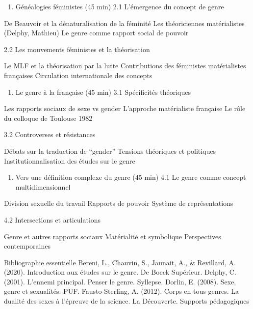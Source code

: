 \documentclass[
  letterpaper,
  DIV=11,
  numbers=noendperiod]{scrreprt}
\providecommand{\tightlist}{%
  \setlength{\itemsep}{0pt}\setlength{\parskip}{0pt}}\usepackage{longtable,booktabs,array}
\begin{document}
\begin{enumerate}
\def\labelenumi{\arabic{enumi}.}
\setcounter{enumi}{1}
\tightlist
\item
  Généalogies féministes (45 min) 2.1 L'émergence du concept de genre
\end{enumerate}

De Beauvoir et la dénaturalisation de la féminité Les théoriciennes
matérialistes (Delphy, Mathieu) Le genre comme rapport social de pouvoir

2.2 Les mouvements féministes et la théorisation

Le MLF et la théorisation par la lutte Contributions des féministes
matérialistes françaises Circulation internationale des concepts

\begin{enumerate}
\def\labelenumi{\arabic{enumi}.}
\setcounter{enumi}{2}
\tightlist
\item
  Le genre à la française (45 min) 3.1 Spécificités théoriques
\end{enumerate}

Les rapports sociaux de sexe vs gender L'approche matérialiste française
Le rôle du colloque de Toulouse 1982

3.2 Controverses et résistances

Débats sur la traduction de ``gender'' Tensions théoriques et politiques
Institutionnalisation des études sur le genre

\begin{enumerate}
\def\labelenumi{\arabic{enumi}.}
\setcounter{enumi}{3}
\tightlist
\item
  Vers une définition complexe du genre (45 min) 4.1 Le genre comme
  concept multidimensionnel
\end{enumerate}

Division sexuelle du travail Rapports de pouvoir Système de
représentations

4.2 Intersections et articulations

Genre et autres rapports sociaux Matérialité et symbolique Perspectives
contemporaines

Bibliographie essentielle Bereni, L., Chauvin, S., Jaunait, A., \&
Revillard, A. (2020). Introduction aux études sur le genre. De Boeck
Supérieur. Delphy, C. (2001). L'ennemi principal. Penser le genre.
Syllepse. Dorlin, E. (2008). Sexe, genre et sexualités. PUF.
Fausto-Sterling, A. (2012). Corps en tous genres. La dualité des sexes à
l'épreuve de la science. La Découverte. Supports pédagogiques
\end{document}
